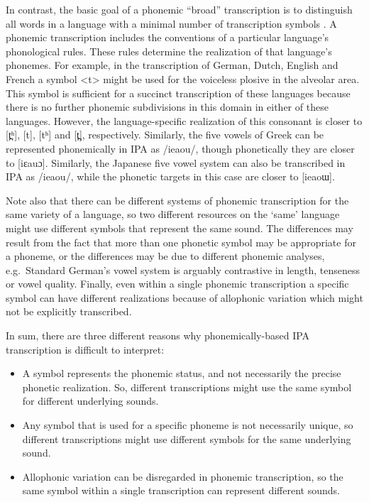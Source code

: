 In contrast, the basic goal of a phonemic ``broad'' transcription is to distinguish all
words in a language with a minimal number of transcription symbols
\citep[19]{Abercrombie1964}. A phonemic transcription includes the conventions
of a particular language's phonological rules. These rules determine the
realization of that language's phonemes. For example, in the transcription of
German, Dutch, English and French a symbol <t> might be used for the voiceless
plosive in the alveolar area. This symbol is sufficient for a succinct
transcription of these languages because there is no further phonemic
subdivisions in this domain in either of these languages. However, the
language-specific realization of this consonant is closer to [t̪ʰ], [t], [tʰ]
and [t̪], respectively. Similarly, the five vowels of Greek can be represented
phonemically in IPA as /ieaou/, though phonetically they are closer to [iεauɔ].
Similarly, the Japanese five vowel system can also be transcribed in IPA as
/ieaou/, while the phonetic targets in this case are closer to [ieaoɯ].

Note also that there can be different systems of phonemic transcription for the
same variety of a language, so two different resources on the `same' language
might use different symbols that represent the same sound. The differences may
result from the fact that more than one phonetic symbol may be appropriate for a
phoneme, or the differences may be due to different phonemic analyses, e.g.\
Standard German's vowel system is arguably contrastive in length, tenseness or
vowel quality. Finally, even within a single phonemic transcription a specific
symbol can have different realizations because of allophonic variation which 
might not be explicitly transcribed.

In sum, there are three different reasons why phonemically-based IPA 
transcription is difficult to interpret:

\begin{itemize}
  
   \item A symbol represents the phonemic status, and not necessarily the
         precise phonetic realization. So, different transcriptions might use 
         the same symbol for different underlying sounds.
   \item Any symbol that is used for a specific phoneme is not necessarily
         unique, so different transcriptions might use different symbols for the
         same underlying sound.
   \item Allophonic variation can be disregarded in phonemic transcription, so
         the same symbol within a single transcription can represent different
         sounds.
  
\end{itemize}

